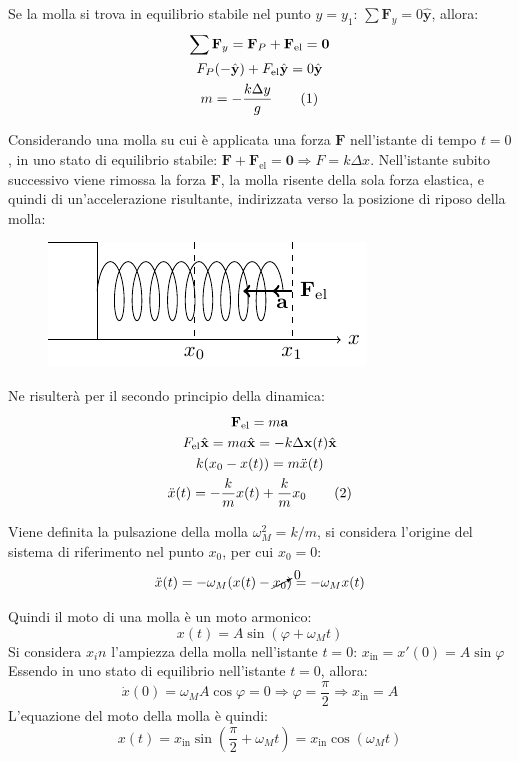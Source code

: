 \documentclass{article}
\newcommand{\vect}[1]{\boldsymbol{\mathbf{#1}}}
\numberwithin{equation}{subsection}
\begin{document}
Se la molla si trova in equilibrio stabile nel punto $y=y_1$: $\sum\vect{F}_y=0\hat{\vect{y}}$, 
allora:
\begin{gather*}
    \sum\vect{F}_y=\vect{F}_P+\vect{F}_{\mathrm{el}}=\vect0\\
     F_P(-\hat{\vect{y}})+F_{\mathrm{el}}\hat{\vect{y}}=0\hat{\vect{y}}\\
    m=\displaystyle-\frac{k\Delta y}{g}\tag{\stepcounter{equation}\theequation}
\end{gather*}

Considerando una molla su cui è applicata una forza $\vect{F}$ nell'istante 
di tempo $t=0$, in uno stato di equilibrio stabile: 
$\vect{F}+\vect{F}_{\mathrm{el}}=\vect{0}\Rightarrow F=k\Delta x$. 
Nell'istante subito successivo viene rimossa la forza $\vect{F}$, 
la molla risente della sola forza elastica, e quindi
di un'accelerazione risultante, indirizzata 
verso la posizione di riposo della molla:

\begin{figure}[H]%
    \centering
    \includegraphics{molla-3.pdf}%
\end{figure}

Ne risulterà per il secondo principio della dinamica:
\begin{gather*}
    \vect{F}_{\mathrm{el}}=m\vect{a}\\
    F_{\mathrm{el}}\hat{\vect{x}}=ma\hat{\vect{x}}=-k\Delta  \vect x(t)\hat{\vect{x}}\\
    k(x_0-x(t))=m\ddot x(t)\\
    \ddot x(t)=-\displaystyle\frac{k}{m}x(t)+\frac{k}{m}x_0\tag{\stepcounter{equation}\theequation}
\end{gather*}

Viene definita la pulsazione della molla $\omega_M^{2}=k/m$, 
si considera l'origine del sistema di riferimento nel punto $x_0$, per cui $x_0=0$:
\begin{equation*}
    \ddot x(t)=-\omega_M(x(t)-\cancelto{0}{x_0})=-\omega_Mx(t)
\end{equation*}

Quindi il moto di una molla è un moto armonico:
\begin{equation*}
    x(t)=A\sin(\varphi + \omega_Mt)
\end{equation*}
Si considera $x_in$ l'ampiezza della molla nell'istante $t=0$:
$x_\mathrm{in}=x'(0)=A\sin\varphi$
Essendo in uno stato di equilibrio nell'istante $t=0$, allora: 
\begin{equation*}
    \dot x(0)=\omega_MA\cos\varphi=0\Rightarrow\varphi=\displaystyle\frac{\pi}{2}\Rightarrow x_\mathrm{in}=A
\end{equation*}
L'equazione del moto della molla è quindi:
\begin{equation}
    x(t)=x_\mathrm{in}\sin\left(\displaystyle\frac{\pi}{2}+\omega_Mt\right)=x_\mathrm{in}\cos(\omega_Mt)
\end{equation}
\end{document}

